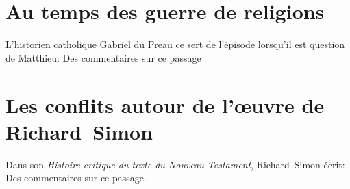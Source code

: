 \documentclass[a4paper]{article}
\begin{document}
\section{Au temps des guerre de religions}
L'historien catholique Gabriel du Preau ce sert de l'épisode lorsqu'il est question de Matthieu:
Des commentaires sur ce passage

\section{Les conflits autour de l'œuvre de Richard~Simon}
Dans son \emph{Histoire critique du texte du Nouveau Testament}, Richard~Simon écrit:
Des commentaires sur ce passage.
\end{document}

